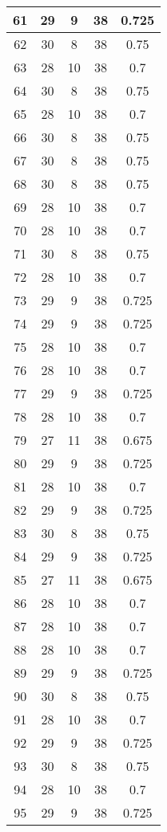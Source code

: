 \documentclass[letterpaper, 12pt]{article}
\begin{document}
\begin{longtable}{|c|c|c|c|c|}
\hline
61 & 29 & 9 & 38 & 0.725 \\
\hline
62 & 30 & 8 & 38 & 0.75 \\
\hline
63 & 28 & 10 & 38 & 0.7 \\
\hline
64 & 30 & 8 & 38 & 0.75 \\
\hline
65 & 28 & 10 & 38 & 0.7 \\
\hline
66 & 30 & 8 & 38 & 0.75 \\
\hline
67 & 30 & 8 & 38 & 0.75 \\
\hline
68 & 30 & 8 & 38 & 0.75 \\
\hline
69 & 28 & 10 & 38 & 0.7 \\
\hline
70 & 28 & 10 & 38 & 0.7 \\
\hline
71 & 30 & 8 & 38 & 0.75 \\
\hline
72 & 28 & 10 & 38 & 0.7 \\
\hline
73 & 29 & 9 & 38 & 0.725 \\
\hline
74 & 29 & 9 & 38 & 0.725 \\
\hline
75 & 28 & 10 & 38 & 0.7 \\
\hline
76 & 28 & 10 & 38 & 0.7 \\
\hline
77 & 29 & 9 & 38 & 0.725 \\
\hline
78 & 28 & 10 & 38 & 0.7 \\
\hline
79 & 27 & 11 & 38 & 0.675 \\
\hline
80 & 29 & 9 & 38 & 0.725 \\
\hline
81 & 28 & 10 & 38 & 0.7 \\
\hline
82 & 29 & 9 & 38 & 0.725 \\
\hline
83 & 30 & 8 & 38 & 0.75 \\
\hline
84 & 29 & 9 & 38 & 0.725 \\
\hline
85 & 27 & 11 & 38 & 0.675 \\
\hline
86 & 28 & 10 & 38 & 0.7 \\
\hline
87 & 28 & 10 & 38 & 0.7 \\
\hline
88 & 28 & 10 & 38 & 0.7 \\
\hline
89 & 29 & 9 & 38 & 0.725 \\
\hline
90 & 30 & 8 & 38 & 0.75 \\
\hline
91 & 28 & 10 & 38 & 0.7 \\
\hline
92 & 29 & 9 & 38 & 0.725 \\
\hline
93 & 30 & 8 & 38 & 0.75 \\
\hline
94 & 28 & 10 & 38 & 0.7 \\
\hline
95 & 29 & 9 & 38 & 0.725 \\

\end{longtable}
\end{document}
